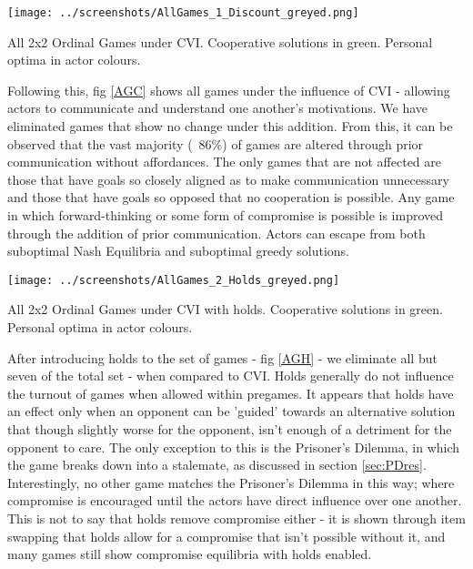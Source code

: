 \begin{fig}[H]
  \begin{minipage}[b]{1.0\linewidth}
    \centering
    \centerline{\texttt{[image: ../screenshots/AllGames\_1\_Discount\_greyed.png]}}
    \caption{All 2x2 Ordinal Games under CVI. Cooperative solutions in green. Personal optima in actor colours.}\medskip\label{AGC}
  \end{minipage}
\end{fig}

Following this, fig \ref{AGC} shows all games under the influence of CVI - allowing actors to communicate and understand one another's motivations. We have eliminated games that show no change under this addition. From this, it can be observed that the vast majority (~86\%) of games are altered through prior communication without affordances. The only games that are not affected are those that have goals so closely aligned as to make communication unnecessary and those that have goals so opposed that no cooperation is possible. Any game in which forward-thinking or some form of compromise is possible is improved through the addition of prior communication. Actors can escape from both suboptimal Nash Equilibria and suboptimal greedy solutions.

\begin{fig}[H]
  \begin{minipage}[b]{1.0\linewidth}
    \centering
    \centerline{\texttt{[image: ../screenshots/AllGames\_2\_Holds\_greyed.png]}}
    \caption{All 2x2 Ordinal Games under CVI with holds. Cooperative solutions in green. Personal optima in actor colours.}\medskip\label{AGH}
  \end{minipage}
\end{fig}

After introducing holds to the set of games - fig \ref{AGH} - we eliminate all but seven of the total set - when compared to CVI. Holds generally do not influence the turnout of games when allowed within pregames. It appears that holds have an effect only when an opponent can be 'guided' towards an alternative solution that though slightly worse for the opponent, isn't enough of a detriment for the opponent to care. The only exception to this is the Prisoner's Dilemma, in which the game breaks down into a stalemate, as discussed in section \ref{sec:PDres}. Interestingly, no other game matches the Prisoner's Dilemma in this way; where compromise is encouraged until the actors have direct influence over one another. This is not to say that holds remove compromise either - it is shown through item swapping that holds allow for a compromise that isn't possible without it, and many games still show compromise equilibria with holds enabled.
